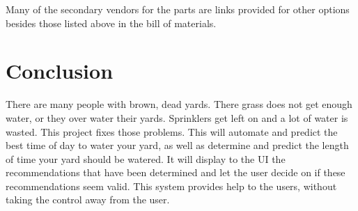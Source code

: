 \documentclass[letterpaper, 10 pt, conference]{ieeeconf}  %
\begin{document}
Many of the secondary vendors for the parts are links provided for other options besides those listed above in the bill of materials.
\section{Conclusion}


There are many people with brown, dead yards. There grass does not get enough water, or they over water their yards. Sprinklers get left on and a lot of water is wasted. This project fixes those problems. This will automate and predict the best time of day to water your yard, as well as determine and predict the length of time your yard should be watered. It will display to the UI the recommendations that have been determined and let the user decide on if these recommendations seem valid. This system provides help to the users, without taking the control away from the user. 
\end{document}

